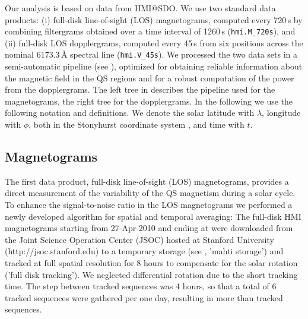 \documentclass{aa}
\begin{document}
Our analysis is based on data from HMI@SDO. We use two standard data products: (i) full-disk line-of-sight (LOS) magnetograms, computed every 720\,s by combining filtergrams obtained over a time interval of 1260\,s (\texttt{hmi.M\_720s}), and (ii) full-disk LOS dopplergrams, computed every 45\,s from six positions across the nominal 6173.3\,\AA{} spectral line (\texttt{hmi.V\_45s}). We processed the two data sets in a semi-automatic pipeline (see ), optimized for obtaining reliable information about the magnetic field in the QS regions and for a robust computation of the \fff power from the dopplergrams. The left tree in  describes the pipeline used for the magnetograms, the right tree for the dopplergrams.
In the following we use the following notation and definitions. 
We denote the solar 
latitude with $\lambda$, longitude with $\phi$, 
both in the Stonyhurst coordinate system \cite[]{Thomson06}, 
and time with $t$. 



\subsection{Magnetograms}

The first data product, full-disk line-of-sight (LOS) magnetograms, provides a direct measurement of the variability of the %
QS
magnetism during a solar cycle. To enhance the signal-to-noise ratio in the LOS magnetograms we performed a newly developed algorithm for spatial and temporal averaging: The full-disk HMI magnetograms starting from 27-Apr-2010 and ending at 
were downloaded from the Joint Science Operation Center (JSOC) hosted at Stanford University (http://jsoc.stanford.edu) to a temporary storage (see , 'mahti storage') and tracked at full spatial resolution for 8 hours to compensate for the solar rotation ('full disk tracking').
We neglected differential rotation due to
the short tracking time.
The step between tracked sequences was 4 hours, so that a total of 6 tracked sequences were gathered per one day, resulting in more than 
 tracked sequences.
\end{document}
